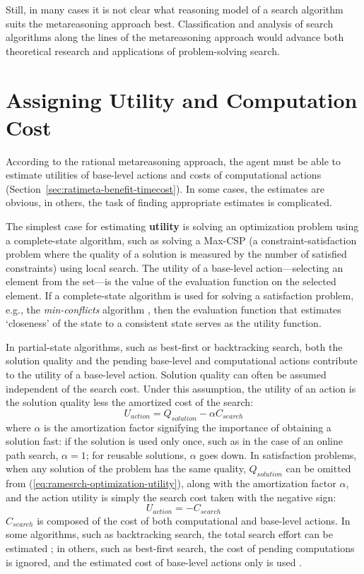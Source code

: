 Still, in many cases it is not clear what reasoning model of a search
algorithm suits the metareasoning approach best. Classification
and analysis of search algorithms along the lines of the metareasoning
approach would advance both theoretical research and applications of
problem-solving search.

\section{Assigning Utility and Computation Cost}

According to the rational metareasoning approach, the agent must be
able to estimate utilities of base-level actions and costs of
computational actions
(Section~\ref{sec:ratimeta-benefit-timecost}). In some cases, the
estimates are obvious, in others, the task of finding appropriate
estimates is complicated.

The simplest case for estimating {\bf utility} is solving an
optimization problem using a complete-state algorithm, such as solving
a Max-CSP (a constraint-satisfaction problem where the quality of a
solution is measured by the number of satisfied constraints) using
local search. The utility  of a base-level action---selecting an
element from the set---is the value of the evaluation function on the
selected element. If a complete-state algorithm is used for solving a
satisfaction problem, e.g., the {\em min-conflicts} algorithm
\cite{Russell.aima}, then the evaluation function that estimates
`closeness' of the state to a consistent state serves as the utility
 function.

In partial-state algorithms, such as best-first or backtracking
search, both the solution quality and the pending base-level and
computational actions contribute to the utility of a base-level
action. Solution quality can often be assumed independent of the
search cost. Under this assumption, the utility of an action is the solution quality
less the amortized cost of the search:
\begin{equation}
\label{eq:ramesrch-optimization-utility}
U_{action}=Q_{solution}-\alpha C_{search}
\end{equation} where $\alpha$ is the amortization factor signifying the
importance of obtaining a solution fast: if the solution is used only
once, such as in the case of an online path search, $\alpha=1$; for
reusable solutions, $\alpha$ goes down. In satisfaction problems, when
any solution of the problem has the same quality, $Q_{solution}$
can be omitted from (\ref{eq:ramesrch-optimization-utility}), along
with the amortization factor $\alpha$, and the action utility is
simply the search cost taken with the negative sign:
\begin{equation}
\label{eq:ramesrch-satisfaction-utility} U_{action}=-C_{search}
\end{equation} $C_{search}$ is composed of the cost of both
computational and base-level actions. In some algorithms, such as
backtracking search, the total search effort can be estimated
\cite{Knuth.backtrack}\cite{Refalo.impact}; in others, such as
best-first search, the cost of pending computations is ignored, and
the estimated cost of base-level actions only is used
\cite{Russell.right}.

